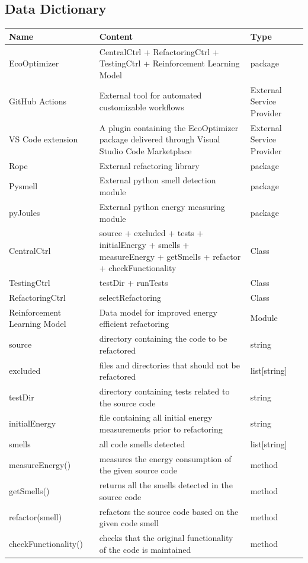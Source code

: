 \documentclass[12pt]{article}
\begin{document}
\subsection{Data Dictionary}

\begin{longtable}{|p{3.5cm}|p{9cm}|p{2cm}|}
  \toprule \textbf{Name} & \textbf{Content} & \textbf{Type} \\
  \midrule
  EcoOptimizer & CentralCtrl + RefactoringCtrl + TestingCtrl + Reinforcement Learning Model & package \\ \hline
  GitHub Actions & External tool for automated customizable workflows & External Service Provider \\ \hline
  VS Code extension & A plugin containing the EcoOptimizer package delivered through Visual Studio Code Marketplace & External Service Provider \\ \hline
  Rope & External refactoring library & package \\ \hline
  Pysmell & External python smell detection module & package \\ \hline
  pyJoules & External python energy measuring module & package \\ \hline
  CentralCtrl & source + excluded + tests + initialEnergy + smells + measureEnergy + getSmells + refactor + checkFunctionality & Class \\ \hline
  TestingCtrl & testDir + runTests & Class \\ \hline
  RefactoringCtrl & selectRefactoring & Class \\ \hline
  Reinforcement Learning Model & Data model for improved energy efficient refactoring & Module \\ \hline
  source & directory containing the code to be refactored & string \\ \hline
  excluded & files and directories that should not be refactored & list[string] \\ \hline
  testDir & directory containing tests related to the source code & string \\ \hline
  initialEnergy & file containing all initial energy measurements prior to refactoring & string \\ \hline
  smells & all code smells detected & list[string] \\ \hline
  measureEnergy() & measures the energy consumption of the given source code & method \\ \hline
  getSmells() & returns all the smells detected in the source code & method \\ \hline
  refactor(smell) & refactors the source code based on the given code smell & method \\ \hline
  checkFunctionality() & checks that the original functionality of the code is maintained & method \\
  \bottomrule
\end{longtable}
\end{document}

